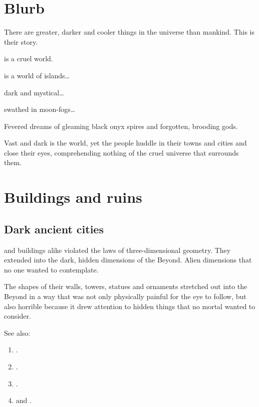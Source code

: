 \section{Blurb}
\begin{blurb}
There are greater, darker and cooler things in the universe than mankind.
This is their story.

\Miith is a cruel world. 

\Miith{} is a world of islands\ldots{}

dark and mystical\ldots{}

swathed in moon-fogs\ldots{}

Fevered dreams of gleaming black onyx spires and forgotten, brooding gods. 

Vast and dark is the world, yet the people huddle in their towns and cities and close their eyes, comprehending nothing of the cruel universe that surrounds them. 
\end{blurb}















\section{Buildings and ruins}









\subsection{Dark ancient cities}
\Draconian and \bane buildings alike violated the laws of three-dimensional geometry.
They extended into the dark, hidden dimensions of the Beyond. 
Alien dimensions that no one wanted to contemplate. 

The shapes of their walls, towers, statues and ornaments stretched out into the Beyond in a way that was not only physically painful for the eye to follow, but also horrible because it drew attention to hidden things that no mortal wanted to consider. 

See also:
\begin{enumerate}
  \item {}.
  \item {}.
  \item {}.
  \item {} and .
\end{enumerate}

